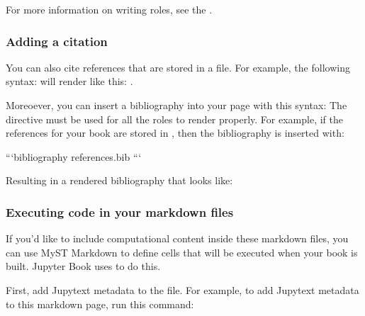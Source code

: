 \documentclass[letterpaper,10pt,english]{sphinxmanual}
\begin{document}
For more information on writing roles, see the
.


\subsubsection{Adding a citation}
\label{\detokenize{markdown:adding-a-citation}}
You can also cite references that are stored in a  file. For example,
the following syntax:  will render like
this: .

Moreoever, you can insert a bibliography into your page with this syntax:
The  directive must be used for all the  roles to
render properly.
For example, if the references for your book are stored in ,
then the bibliography is inserted with:

\begin{sphinxVerbatim}[commandchars=\\\{\}]
```\PYGZob{}bibliography\PYGZcb{} references.bib
```
\end{sphinxVerbatim}

Resulting in a rendered bibliography that looks like:




\subsubsection{Executing code in your markdown files}
\label{\detokenize{markdown:executing-code-in-your-markdown-files}}
If you’d like to include computational content inside these markdown files,
you can use MyST Markdown to define cells that will be executed when your
book is built. Jupyter Book uses  to do this.

First, add Jupytext metadata to the file. For example, to add Jupytext metadata
to this markdown page, run this command:

\begin{sphinxVerbatim}[commandchars=\\\{\}]
   
\end{sphinxVerbatim}
\end{document}

